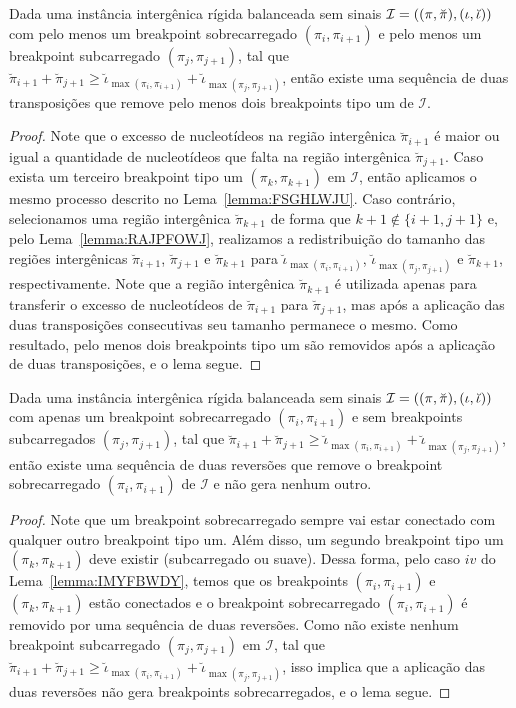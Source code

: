 \begin{lemma}\label{lemma:RHTVEKOL}
Dada uma instância intergênica rígida balanceada sem sinais $\mathcal{I}=((\pi,\breve\pi),\break(\iota,\breve\iota))$ com pelo menos um breakpoint sobrecarregado $(\pi_i,\pi_{i+1})$ e pelo menos um breakpoint subcarregado $(\pi_j,\pi_{j+1})$, tal que $\breve\pi_{i+1} + \breve\pi_{j+1} \ge \breve\iota_{\max(\pi_i,\pi_{i+1})} + \breve\iota_{\max(\pi_j,\pi_{j+1})}$, então existe uma sequência de duas transposições que remove pelo menos dois breakpoints tipo um de $\mathcal{I}$.
\end{lemma}
\begin{proof}
Note que o excesso de nucleotídeos na região intergênica $\breve\pi_{i+1}$ é maior ou igual a quantidade de nucleotídeos que falta na região intergênica $\breve\pi_{j+1}$. Caso exista um terceiro breakpoint tipo um $(\pi_k,\pi_{k+1})$ em $\mathcal{I}$, então aplicamos o mesmo processo descrito no Lema~\ref{lemma:FSGHLWJU}. Caso contrário, selecionamos uma região intergênica $\breve\pi_{k+1}$ de forma que $k+1 \notin \{i+1,j+1\}$ e, pelo Lema~\ref{lemma:RAJPFOWJ}, realizamos a redistribuição do tamanho das regiões intergênicas $\breve\pi_{i+1}$, $\breve\pi_{j+1}$ e $\breve\pi_{k+1}$ para $\breve\iota_{\max(\pi_i,\pi_{i+1})}$, $\breve\iota_{\max(\pi_j,\pi_{j+1})}$ e $\breve\pi_{k+1}$, respectivamente. Note que a região intergênica $\breve\pi_{k+1}$ é utilizada apenas para transferir o excesso de nucleotídeos de $\breve\pi_{i+1}$ para $\breve\pi_{j+1}$, mas após a aplicação das duas transposições consecutivas seu tamanho permanece o mesmo. Como resultado, pelo menos dois breakpoints tipo um são removidos após a aplicação de duas transposições, e o lema segue.
\end{proof}

\begin{lemma}\label{lemma:ICDGSTEE}
Dada uma instância intergênica rígida balanceada sem sinais $\mathcal{I}=((\pi,\breve\pi),\break(\iota,\breve\iota))$ com apenas um breakpoint sobrecarregado $(\pi_i,\pi_{i+1})$ e sem breakpoints subcarregados $(\pi_j,\pi_{j+1})$, tal que $\breve\pi_{i+1} + \breve\pi_{j+1} \ge \breve\iota_{\max(\pi_i,\pi_{i+1})} + \breve\iota_{\max(\pi_j,\pi_{j+1})}$, então existe uma sequência de duas reversões que remove o breakpoint sobrecarregado $(\pi_i,\pi_{i+1})$ de $\mathcal{I}$ e não gera nenhum outro.
\end{lemma}
\begin{proof}
Note que um breakpoint sobrecarregado sempre vai estar conectado com qualquer outro breakpoint tipo um. Além disso, um segundo breakpoint tipo um $(\pi_k,\pi_{k+1})$ deve existir (subcarregado ou suave). Dessa forma, pelo caso $iv$ do Lema~\ref{lemma:IMYFBWDY}, temos que os breakpoints $(\pi_i,\pi_{i+1})$ e $(\pi_k,\pi_{k+1})$ estão conectados e o breakpoint sobrecarregado $(\pi_i,\pi_{i+1})$ é removido por uma sequência de duas reversões. Como não existe nenhum breakpoint subcarregado $(\pi_j,\pi_{j+1})$ em $\mathcal{I}$, tal que $\breve\pi_{i+1} + \breve\pi_{j+1} \ge \breve\iota_{\max(\pi_i,\pi_{i+1})} + \breve\iota_{\max(\pi_j,\pi_{j+1})}$, isso implica que a aplicação das duas reversões não gera breakpoints sobrecarregados, e o lema segue.
\end{proof}

